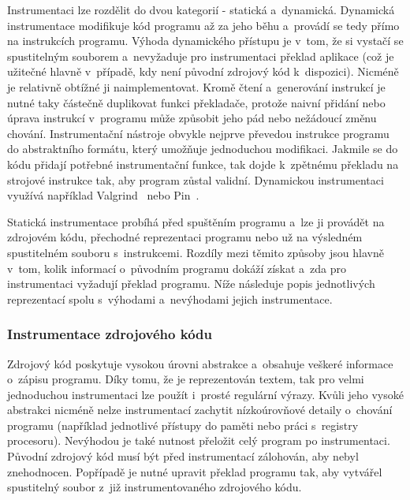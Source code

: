 Instrumentaci lze rozdělit do dvou kategorií - statická a~dynamická. Dynamická instrumentace modifikuje kód programu až za jeho běhu a~provádí se tedy přímo na instrukcích programu. Výhoda dynamického přístupu je v~tom, že si vystačí se spustitelným souborem a~nevyžaduje pro instrumentaci překlad aplikace (což je užitečné hlavně v~případě, kdy není původní zdrojový kód k~dispozici). Nicméně je relativně obtížné ji naimplementovat. Kromě čtení a~generování instrukcí je nutné taky částečně duplikovat funkci překladače, protože naivní přidání nebo úprava instrukcí v~programu může způsobit jeho pád nebo nežádoucí změnu chování. Instrumentační nástroje obvykle nejprve převedou instrukce programu do abstraktního formátu, který umožňuje jednoduchou modifikaci. Jakmile se do kódu přidají potřebné instrumentační funkce, tak dojde k~zpětnému překladu na strojové instrukce tak, aby program zůstal validní.
Dynamickou instrumentaci využívá například Valgrind~\cite{valgrind} nebo Pin~\cite{pin}.

Statická instrumentace probíhá před spuštěním programu a~lze ji provádět na zdrojovém kódu, přechodné reprezentaci programu nebo už na výsledném spustitelném souboru s~instrukcemi. Rozdíly mezi těmito způsoby jsou hlavně v~tom, kolik informací o~původním programu dokáží získat a~zda pro instrumentaci vyžadují překlad programu. Níže následuje popis jednotlivých reprezentací spolu s~výhodami a~nevýhodami jejich instrumentace.

\subsubsection*{Instrumentace zdrojového kódu}
Zdrojový kód poskytuje vysokou úrovni abstrakce a~obsahuje veškeré informace o~zápisu programu. Díky tomu, že je reprezentován textem, tak pro velmi jednoduchou instrumentaci lze použít i~prosté regulární výrazy. Kvůli jeho vysoké abstrakci nicméně nelze instrumentací zachytit nízkoúrovňové detaily o~chování programu (například jednotlivé přístupy do paměti nebo práci s~registry procesoru). Nevýhodou je také nutnost přeložit celý program po instrumentaci. Původní zdrojový kód musí být před instrumentací zálohován, aby nebyl znehodnocen. Popřípadě je nutné upravit překlad programu tak, aby vytvářel spustitelný soubor z~již instrumentovaného zdrojového kódu.

